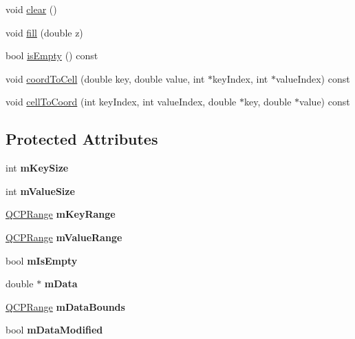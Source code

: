 \begin{DoxyCompactItemize}
\item 
void \mbox{\hyperlink{class_q_c_p_color_map_data_a9910ba830e96955bd5c8e5bef1e77ef3}{clear}} ()
\item 
void \mbox{\hyperlink{class_q_c_p_color_map_data_a350f783260eb9b5de5c7b5e0d5d3e3c2}{fill}} (double z)
\item 
bool \mbox{\hyperlink{class_q_c_p_color_map_data_aea88cc75a76ca571acf29b2ba8ac970d}{is\+Empty}} () const
\item 
void \mbox{\hyperlink{class_q_c_p_color_map_data_aca5b29e0ca2f299c9060fc6e1f74d0c8}{coord\+To\+Cell}} (double key, double value, int $\ast$key\+Index, int $\ast$value\+Index) const
\item 
void \mbox{\hyperlink{class_q_c_p_color_map_data_af1a36385c78ab624cd617065602408b6}{cell\+To\+Coord}} (int key\+Index, int value\+Index, double $\ast$key, double $\ast$value) const
\end{DoxyCompactItemize}
\subsection*{Protected Attributes}
\begin{DoxyCompactItemize}
\item 
\mbox{\label{class_q_c_p_color_map_data_a354e06462023340fbc03894b22499f6d}} 
int {\bfseries m\+Key\+Size}
\item 
\mbox{\label{class_q_c_p_color_map_data_ae8ee9093632a59f55eb4fc06579ed256}} 
int {\bfseries m\+Value\+Size}
\item 
\mbox{\label{class_q_c_p_color_map_data_aaaafd0d7d0f153dbd152f3daf34254ee}} 
\mbox{\hyperlink{class_q_c_p_range}{Q\+C\+P\+Range}} {\bfseries m\+Key\+Range}
\item 
\mbox{\label{class_q_c_p_color_map_data_a225bb96f10c1a27b51ae59249477dbef}} 
\mbox{\hyperlink{class_q_c_p_range}{Q\+C\+P\+Range}} {\bfseries m\+Value\+Range}
\item 
\mbox{\label{class_q_c_p_color_map_data_a10e91aa89ed05bd177b1f81e07b465b8}} 
bool {\bfseries m\+Is\+Empty}
\item 
\mbox{\label{class_q_c_p_color_map_data_ac1682862022f575191351c9825187d39}} 
double $\ast$ {\bfseries m\+Data}
\item 
\mbox{\label{class_q_c_p_color_map_data_a1798b3dcc0a27091d196bfd156dcb3f2}} 
\mbox{\hyperlink{class_q_c_p_range}{Q\+C\+P\+Range}} {\bfseries m\+Data\+Bounds}
\item 
\mbox{\label{class_q_c_p_color_map_data_ad3cc682da2ac14e5acdbc05cf4d3d93b}} 
bool {\bfseries m\+Data\+Modified}
\end{DoxyCompactItemize}

